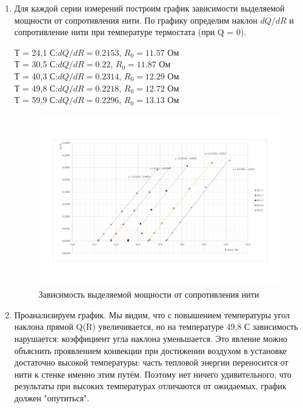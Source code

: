 \documentclass{article}
\begin{document}
\begin{enumerate}
     \item Для каждой серии измерений построим график зависимости выделяемой мощности от сопротивления нити. По графику определим наклон $dQ/dR$ и сопротивление нити при температуре термостата (при Q = 0). \par 
     \begin{center}
     Т = 24,1 С:\hspace{1cm}$dQ/dR = 0.2153$, $R_0 = 11.57$ Ом\\
     Т = 30,5 С:\hspace{1cm}$dQ/dR = 0.22$, $R_0 = 11.87$ Ом\\
     Т = 40,3 С:\hspace{1cm}$dQ/dR = 0.2314$, $R_0 = 12.29$ Ом\\
     Т = 49,8 С:\hspace{1cm}$dQ/dR = 0.2218$, $R_0 = 12.72$ Ом\\
     Т = 59,9 С:\hspace{1cm}$dQ/dR = 0.2296$, $R_0 = 13.13$ Ом\\ 
     \end{center}
     
         \begin{figure}[H]
    \centering
    \includegraphics[width=20cm, angle=90]{graph-1.png}
    \caption{Зависимость выделяемой мощности от сопротивления нити}
    \label{fig:vac}
    \end{figure}
     
     \item Проанализируем график. Мы видим, что с повышением температуры угол наклона прямой Q(R) увеличивается, но на температуре 49,8 С зависимость нарушается: коэффициент угла наклона уменьшается. Это явление можно объяснить проявлением конвекции при достижении воздухом в установке достаточно высокой температуры: часть тепловой энергии переносится от нити к стенке именно этим путём. Поэтому нет ничего удивительного, что результаты при высоких температурах отличаются от ожидаемых, график должен "опутиться". 
     

\end{enumerate}
\end{document}
